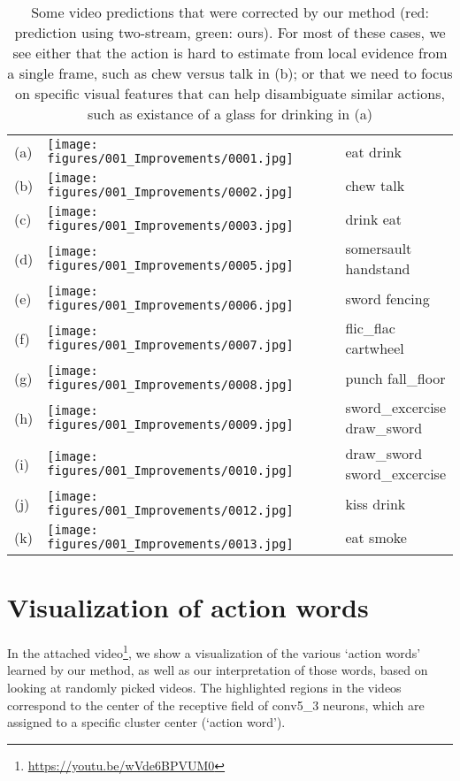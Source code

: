 \documentclass[10pt,twocolumn,letterpaper]{article}
\newcommand{\old}[1]{{\color{red} #1}}
\newcommand{\new}[1]{{\color{ao(english)} #1}}
\newcommand{\oldnew}[2]{\old{#1}  \new{#2}}
\begin{document}
\begin{table*}[]
\centering
\caption{Some video predictions that were corrected by our method (red: prediction using two-stream,
green: ours).
For most of these cases, we see either that the action is hard to estimate from local evidence
  from a single frame, such as chew versus talk in (b); or that we need to focus on
specific visual features that can help disambiguate similar actions, such as existance
  of a glass for drinking in (a)}
\label{fig:video_compare}
\begin{tabular}{m{0.005\linewidth}m{0.8\linewidth}m{0.195\linewidth}}
  (a) & \texttt{[image: figures/001\_Improvements/0001.jpg]} & \oldnew{eat}{drink} \\
  (b) & \texttt{[image: figures/001\_Improvements/0002.jpg]} & \oldnew{chew}{talk} \\
  (c) & \texttt{[image: figures/001\_Improvements/0003.jpg]} & \oldnew{drink}{eat} \\
	  (d) & \texttt{[image: figures/001\_Improvements/0005.jpg]} & \oldnew{somersault}{handstand} \\
  (e) & \texttt{[image: figures/001\_Improvements/0006.jpg]} & \oldnew{sword}{fencing} \\
  (f) & \texttt{[image: figures/001\_Improvements/0007.jpg]} & \oldnew{flic\_flac}{cartwheel} \\
  (g) & \texttt{[image: figures/001\_Improvements/0008.jpg]} & \oldnew{punch}{fall\_floor} \\
  (h) & \texttt{[image: figures/001\_Improvements/0009.jpg]} & \oldnew{sword\_excercise}{draw\_sword} \\
  (i) & \texttt{[image: figures/001\_Improvements/0010.jpg]} & \oldnew{draw\_sword}{sword\_excercise} \\
	  (j) & \texttt{[image: figures/001\_Improvements/0012.jpg]} & \oldnew{kiss}{drink} \\
  (k) & \texttt{[image: figures/001\_Improvements/0013.jpg]} & \oldnew{eat}{smoke} \\
\end{tabular}
\end{table*}


\section{Visualization of action words}
In the attached video\footnote{\url{https://youtu.be/wVde6BPVUM0}}, we show a visualization of the various `action words' learned by our method, as well as our interpretation of those words, based on looking at randomly picked videos.
The highlighted regions in the videos correspond to the center of the receptive
field of conv5\_3 neurons, which are assigned to a specific cluster center (`action word').
\end{document}
